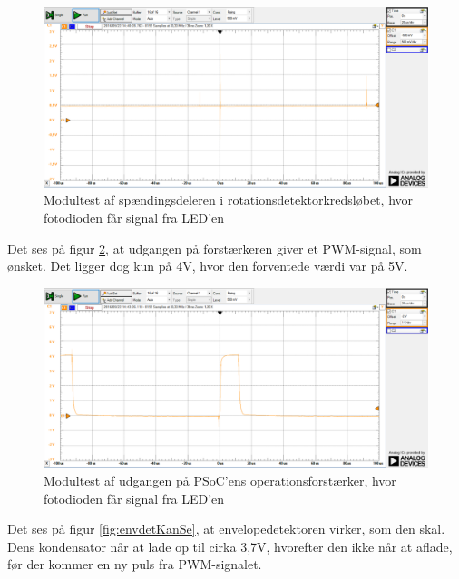 \begin{figure}[H]
	\centering
	\includegraphics[width=\textwidth]{Test/images/AffyringTest/KanSe/spaendingsdeler}
	\caption{Modultest af spændingsdeleren i rotationsdetektorkredsløbet, hvor fotodioden får signal fra LED'en}
	\label{fig:spaendingsdelerKanSe}
\end{figure}

Det ses på figur \ref{fig:udgangOpAmpKanSe}, at udgangen på forstærkeren giver et PWM-signal, som ønsket. Det ligger dog kun på 4V, hvor den forventede værdi var på 5V. 

\begin{figure}[H]
	\centering
	\includegraphics[width=\textwidth]{Test/images/AffyringTest/KanSe/udgang_opamp_psoc}
	\caption{Modultest af udgangen på PSoC'ens operationsforstærker, hvor fotodioden får signal fra LED'en}
	\label{fig:udgangOpAmpKanSe}
\end{figure}

Det ses på figur \ref{fig:envdetKanSe}, at envelopedetektoren virker, som den skal. Dens kondensator når at lade op til cirka 3,7V, hvorefter den ikke når at aflade, før der kommer en ny puls fra PWM-signalet. 


